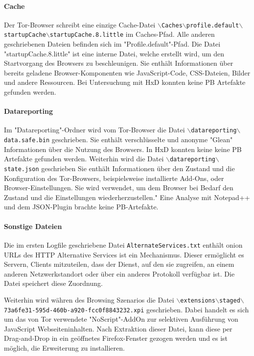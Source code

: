 \begin{appendices}
\paragraph*{Cache}
Der Tor-Browser schreibt eine einzige Cache-Datei \texttt{$\backslash$Caches$\backslash$profile.default$\backslash$startupCache$\backslash$startupCache.8.little} im Caches-Pfad. Alle anderen geschriebenen Dateien befinden sich im "Profile.default"-Pfad.
Die Datei "startupCache.8.little" ist eine interne Datei, welche erstellt wird, um den Startvorgang des Browsers zu beschleunigen. Sie enthält Informationen über bereits geladene Browser-Komponenten wie JavaScript-Code, CSS-Dateien, Bilder und andere Ressourcen.  %
Bei Untersuchung mit HxD konnten keine PB Artefakte gefunden werden.

\paragraph*{Datareporting}
Im "Datareporting"-Ordner wird vom Tor-Browser die Datei \texttt{$\backslash$datareporting$\backslash$data.safe.bin} geschrieben. Sie enthält verschlüsselte und anonyme "Glean" Informationen über die Nutzung des Browsers. %
In HxD konnten keine keine PB Artefakte gefunden werden.
Weiterhin wird die Datei \texttt{$\backslash$datareporting$\backslash$state.json} geschrieben
Sie enthält Informationen über den Zustand und die Konfiguration des Tor-Browsers, beispielsweise installierte Add-Ons, oder Browser-Einstellungen. Sie wird verwendet, um dem Browser bei Bedarf den Zustand und die Einstellungen wiederherzustellen."
Eine Analyse mit Notepad++ und dem JSON-Plugin brachte keine PB-Artefakte.

\paragraph*{Sonstige Dateien}
Die im ersten Logfile geschriebene Datei \texttt{AlternateServices.txt}
enthält onion URLs des HTTP Alternative Services ist ein Mechanismus. Dieser ermöglicht es Servern, Clients mitzuteilen, dass der Dienst, auf den sie zugreifen, an einem anderen Netzwerkstandort oder über ein anderes Protokoll verfügbar ist. Die Datei speichert diese Zuordnung.

Weiterhin wird währen des Browsing Szenarios die Datei \texttt{$\backslash$extensions$\backslash$staged$\backslash${73a6fe31-595d-460b-a920-fcc0f8843232}.xpi} geschrieben. Dabei handelt es sich um das von Tor verwendete "NoScript"-AddOn zur selektiven Ausführung von JavaScript Webseiteninhalten.
Nach Extraktion dieser Datei, kann diese per Drag-and-Drop in ein geöffnetes Firefox-Fenster gezogen werden und es ist möglich, die Erweiterung zu installieren.


\end{appendices}
